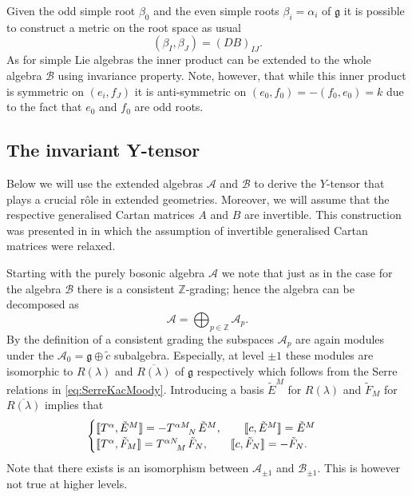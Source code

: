 Given the odd simple root $\beta_0$ and the even simple roots $\beta_i=\alpha_i$ of $\mathfrak{g}$ it is possible to construct a metric on the root space as usual
\begin{equation}
    (\beta_I,\beta_J) = (DB)_{IJ}.
\end{equation}
As for simple Lie algebras the inner product can be extended to the whole algebra $\mathscr{B}$ using invariance property. Note, however, that while this inner product is symmetric on $(e_i,f_J)$ it is anti-symmetric on $(e_0,f_0)=-(f_0,e_0)=k$ due to the fact that $e_0$ and $f_0$ are odd roots.    


\subsection{The invariant Y-tensor\label{sec:InvYTensor}}
Below we will use the extended algebras $\mathscr{A}$ and $\mathscr{B}$ to derive the $Y$-tensor that plays a crucial rôle in extended geometries. Moreover, we will assume that the respective generalised Cartan matrices $A$ and $B$ are invertible. This construction was presented in \cite{CederwallPalmkvist2017} in which the assumption of invertible generalised Cartan matrices were relaxed.

Starting with the purely bosonic algebra $\mathscr{A}$ we note that just as in the case for the algebra $\mathscr{B}$ there is a consistent $\mathbb{Z}$-grading; hence the algebra can be decomposed as 
\begin{equation}
    \mathscr{A} =\bigoplus_{p\in \mathbb{Z}}\mathscr{A}_p.
\end{equation}
By the definition of a consistent grading the subspaces $\mathscr{A}_p$ are again modules under the $\mathscr{A}_0=\mathfrak{g}\oplus \tilde{c}$ subalgebra. Especially, at level $\pm 1$ these modules are isomorphic to $R(\lambda)$ and $\overbar{R(\lambda)}$ of $\mathfrak{g}$ respectively which follows from the Serre relations in \eqref{eq:SerreKacMoody}. Introducing a basis $\tilde{E}^M$ for $R(\lambda)$ and $\tilde{F}_M$ for $\overbar{R(\lambda)}$ implies that 
\begin{equation}\label{eq:A0Action}
    \begin{cases}
        \llbracket T^\alpha, \tilde{E}^M\rrbracket = -\tensor{T}{^{\alpha M}_N}\tilde{E}^M,\qquad \llbracket c,\tilde{E}^M\rrbracket= \tilde{E}^M\\
        \llbracket T^\alpha, \tilde{F}_M\rrbracket = \tensor{T}{^{\alpha N}_M}\tilde{F}_N,\qquad \llbracket c,\tilde{F}_N\rrbracket= -\tilde{F}_N. 
    \end{cases}
\end{equation}
Note that there exists is an isomorphism between $\mathscr{A}_{\pm 1}$ and $\mathscr{B}_{\pm 1}$. This is however not true at higher levels. 

